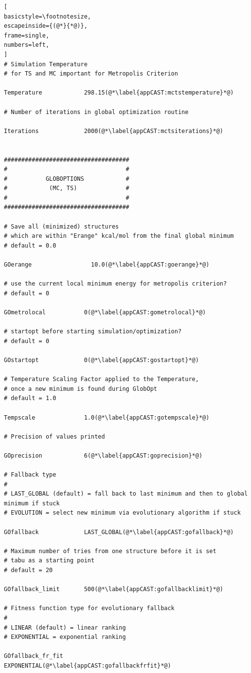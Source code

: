 \documentclass[a4paper,11pt]{scrartcl}
\begin{document}
\begin{lstlisting}[
basicstyle=\footnotesize,
escapeinside={(@*}{*@)},
frame=single,
numbers=left,
]
# Simulation Temperature 
# for TS and MC important for Metropolis Criterion

Temperature            298.15(@*\label{appCAST:mctstemperature}*@)

# Number of iterations in global optimization routine 

Iterations             2000(@*\label{appCAST:mctsiterations}*@)


####################################
#                                  #
#           GLOBOPTIONS            #
#            (MC, TS)              #
#                                  #
####################################

# Save all (minimized) structures 
# which are within "Erange" kcal/mol from the final global minimum
# default = 0.0

GOerange                 10.0(@*\label{appCAST:goerange}*@)

# use the current local minimum energy for metropolis criterion?
# default = 0

GOmetrolocal           0(@*\label{appCAST:gometrolocal}*@)

# startopt before starting simulation/optimization?
# default = 0

GOstartopt             0(@*\label{appCAST:gostartopt}*@)

# Temperature Scaling Factor applied to the Temperature, 
# once a new minimum is found during GlobOpt
# default = 1.0

Tempscale              1.0(@*\label{appCAST:gotempscale}*@)

# Precision of values printed

GOprecision            6(@*\label{appCAST:goprecision}*@)

# Fallback type 
# 
# LAST_GLOBAL (default) = fall back to last minimum and then to global minimum if stuck
# EVOLUTION = select new minimum via evolutionary algorithm if stuck

GOfallback             LAST_GLOBAL(@*\label{appCAST:gofallback}*@)

# Maximum number of tries from one structure before it is set
# tabu as a starting point
# default = 20

GOfallback_limit       500(@*\label{appCAST:gofallbacklimit}*@)

# Fitness function type for evolutionary fallback
#
# LINEAR (default) = linear ranking
# EXPONENTIAL = exponential ranking

GOfallback_fr_fit              EXPONENTIAL(@*\label{appCAST:gofallbackfrfit}*@)


\end{lstlisting}
\end{document}
